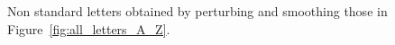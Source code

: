 \begin{figure}[htp]
  \caption{Non standard letters obtained by perturbing and smoothing
    those in Figure~\ref{fig:all_letters_A_Z}.}
  \label{fig:all_ptb_letters_A_Z}
\end{figure}



